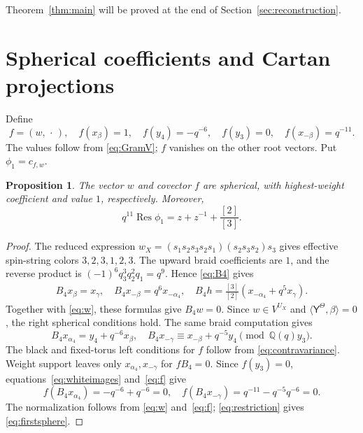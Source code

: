 \documentclass[12pt,reqno]{amsart}
\theoremstyle{plain}
\newtheorem{proposition}[theorem]{Proposition}
\theoremstyle{definition}
\numberwithin{equation}{section}
\newcommand{\kk}{\mathbb Q(q)}
\newcommand{\Res}{\operatorname{Res}}
\begin{document}
Theorem~\ref{thm:main} will be proved at the end of
Section~\ref{sec:reconstruction}.

\section{Spherical coefficients and Cartan projections}
\label{sec:cartan}

Define
\begin{equation}\label{eq:f}
 f=(w,\,\cdot\,),\quad
 f(x_\beta)=1,\quad f(y_4)=-q^{-6},\quad f(y_3)=0,\quad
 f(x_{-\beta})=q^{-11}.
\end{equation}
The values follow from \eqref{eq:GramV}; $f$ vanishes on the
other root vectors. Put $\phi_1=c_{f,w}$.

\begin{proposition}\label{prop:fundamental}
	The vector $w$ and covector $f$ are spherical, with highest-weight
	coefficient and value $1$, respectively. Moreover,
	\begin{equation}\label{eq:firstsphere}
				q^{11}\Res\phi_1=z+z^{-1}+\frac{[2]}{[3]}.
	\end{equation}
\end{proposition}

\begin{proof}
The reduced expression
$w_X=(s_1s_2s_3s_2s_1)(s_2s_3s_2)s_3$
gives effective spin-string colors $3,2,3,1,2,3$.
The upward braid coefficients are $1$, and the reverse product is
$(-1)^6q_3^3q_2^2q_1=q^9$. Hence \eqref{eq:B4} gives
\[
\begin{aligned}
 B_4x_\beta=x_\gamma,\quad
 B_4x_{-\beta}=q^6x_{-\alpha_4},\quad
 B_4h=\frac{[3]}{[2]}(x_{-\alpha_4}+q^5x_\gamma).
\end{aligned}
\]
Together with \eqref{eq:w}, these formulas give $B_4w=0$.
Since $w\in V^{U_X}$ and $\langle\mathsf Y^\Theta,\beta\rangle=0$,
the right spherical conditions hold.
The same braid computation gives
\begin{equation}\label{eq:whiteimages}
 B_4x_{\alpha_4}=y_4+q^{-6}x_\beta,\quad
 B_4x_{-\gamma}\equiv x_{-\beta}+q^{-5}y_4
 \pmod{\kk y_3}.
\end{equation}
The black and fixed-torus left conditions for $f$ follow from
\eqref{eq:contravariance}.
Weight support leaves only $x_{\alpha_4},x_{-\gamma}$ for $fB_4=0$.
Since $f(y_3)=0$, equations~\eqref{eq:whiteimages} and~\eqref{eq:f} give
\[
 f(B_4x_{\alpha_4})=-q^{-6}+q^{-6}=0,\quad
 f(B_4x_{-\gamma})=q^{-11}-q^{-5}q^{-6}=0.
\]
The normalization follows from \eqref{eq:w} and~\eqref{eq:f};
\eqref{eq:restriction} gives \eqref{eq:firstsphere}.
\end{proof}
\end{document}

